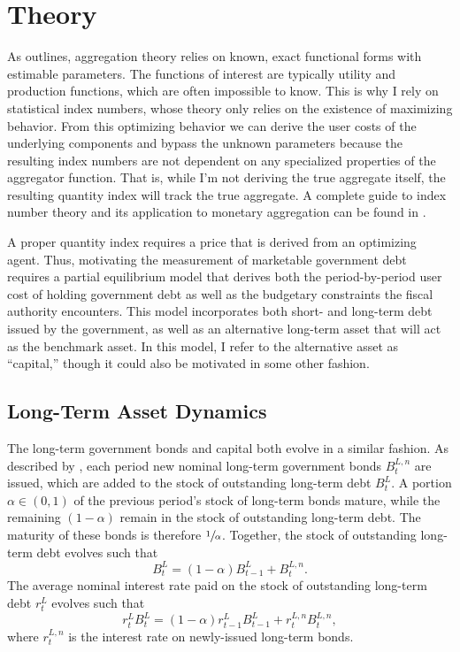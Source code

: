 \documentclass[11pt,a4paper,margin=1.5in]{article}
\begin{document}
\section{Theory}
\label{sec:Theory}
As \citet{Barnett:1980} outlines, aggregation theory relies on known, exact functional forms with estimable parameters.
The functions of interest are typically utility and production functions, which are often impossible to know.
This is why I rely on statistical index numbers, whose theory only relies on the existence of maximizing behavior.
From this optimizing behavior we can derive the user costs of the underlying components and bypass the unknown parameters because the resulting index numbers are not dependent on any specialized properties of the aggregator function.
That is, while I'm not deriving the true aggregate itself, the resulting quantity index will track the true aggregate.
A complete guide to index number theory and its application to monetary aggregation can be found in \citet{Barnett-Serletis:2000}.

A proper quantity index requires a price that is derived from an optimizing agent.
Thus, motivating the measurement of marketable government debt requires a partial equilibrium model that derives both the period-by-period user cost of holding government debt as well as the budgetary constraints the fiscal authority encounters.
This model incorporates both short- and long-term debt issued by the government, as well as an alternative long-term asset that will act as the benchmark asset. 
In this model, I refer to the alternative asset as ``capital,'' though it could also be motivated in some other fashion. 

\subsection{Long-Term Asset Dynamics}
The long-term government bonds and capital both evolve in a similar fashion.
As described by \citet{Krause-Moyen:2016}, each period new nominal long-term government bonds $B^{L,n}_t$ are issued, which are added to the stock of outstanding long-term debt $B^L_t$.
A portion $\alpha \in (0,1)$ of the previous period's stock of long-term bonds mature, while the remaining $(1-\alpha)$ remain in the stock of outstanding long-term debt. 
The maturity of these bonds is therefore $\sfrac{1}{\alpha}$.
Together, the stock of outstanding long-term debt evolves such that 
\begin{equation}
	B^L_t = (1-\alpha)B^L_{t-1} + B^{L,n}_t.
	\label{eq:LoM_DebtLevel}
\end{equation}
The average nominal interest rate paid on the stock of outstanding long-term debt $r^L_t$ evolves such that
\begin{equation}
	r^L_t B^L_t = (1-\alpha)r^L_{t-1}B^L_{t-1} + r^{L,n}_tB^{L,n}_t,
	\label{eq:LoM_DebtReturn}
\end{equation}
where $r^{L,n}_t$ is the interest rate on newly-issued long-term bonds. 
\end{document}
